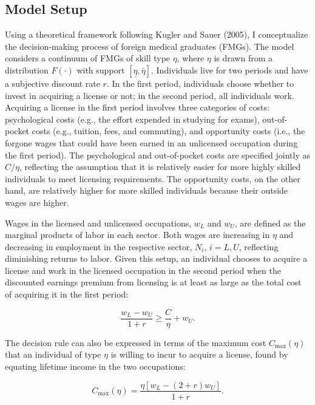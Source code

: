 \documentclass[12pt]{article}
\begin{document}
\subsection{Model Setup}
Using a theoretical framework following Kugler and Sauer (2005), I conceptualize the decision-making process of foreign medical graduates (FMGs). The model considers a continuum of FMGs of skill type $\eta$, where $\eta$ is drawn from a distribution $F(\cdot)$ with support $[\underline{\eta}, \bar{\eta}]$. Individuals live for two periods and have a subjective discount rate $r$. In the first period, individuals choose whether to invest in acquiring a license or not; in the second period, all individuals work. Acquiring a license in the first period involves three categories of costs: psychological costs (e.g., the effort expended in studying for exams), out-of-pocket costs (e.g., tuition, fees, and commuting), and opportunity costs (i.e., the forgone wages that could have been earned in an unlicensed occupation during the first period). The psychological and out-of-pocket costs are specified jointly as $C/\eta$, reflecting the assumption that it is relatively easier for more highly skilled individuals to meet licensing requirements. The opportunity costs, on the other hand, are relatively higher for more skilled individuals because their outside wages are higher.

Wages in the licensed and unlicensed occupations, $w_L$ and $w_U$, are defined as the marginal products of labor in each sector. Both wages are increasing in $\eta$ and decreasing in employment in the respective sector, $N_i$, $i = L, U$, reflecting diminishing returns to labor. Given this setup, an individual chooses to acquire a license and work in the licensed occupation in the second period when the discounted earnings premium from licensing is at least as large as the total cost of acquiring it in the first period:

\begin{equation}
    \frac{w_L - w_U}{1+r} \geq \frac{C}{\eta} + w_U.
\end{equation}

The decision rule can also be expressed in terms of the maximum cost $C_{\max}(\eta)$ that an individual of type $\eta$ is willing to incur to acquire a license, found by equating lifetime income in the two occupations:

\begin{equation}
    C_{\max}(\eta) = \frac{\eta\left[w_L - (2+r)w_U\right]}{1+r}.
\end{equation}
\end{document}
